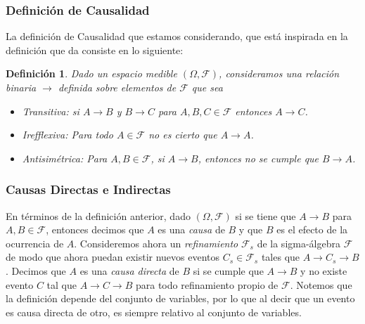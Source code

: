 \documentclass[11pt]{article}
\theoremstyle{plain}
\newtheorem{defi}[teo]{Definición}
\begin{document}
		\subsubsection{Definición de Causalidad}
		La definición de Causalidad que estamos considerando, que está inspirada en la definición que da  \cite{spirtes2000causation} consiste en lo siguiente:
		\begin{defi}
		Dado un espacio medible $(\Omega, \mathcal{F})$, consideramos una relación binaria $\to$ definida sobre elementos de $\mathcal{F}$ que sea
		\begin{itemize}
		\item Transitiva: si $A \to B$ y $B \to C$ para $A,B,C \in \mathcal{F}$ entonces $A \to C$.
		\item Irefflexiva: Para todo $A \in \mathcal{F}$ no es cierto que $A \to A$.
		\item Antisimétrica: Para $A, B \in \mathcal{F}$, si $A \to B$, entonces no se cumple que $B \to A$.
		\end{itemize}
		\end{defi}
		\subsubsection{Causas Directas e Indirectas}
		En términos de la definición anterior, dado $(\Omega, \mathcal{F})$ si se tiene que $A \to B$ para $A,B \in \mathcal{F}$, entonces decimos que $A$ es una \textit{causa} de $B$ y que $B$ es el efecto de la ocurrencia de $A$. Consideremos ahora un \textit{refinamiento} $\mathcal{F}_s$ de la sigma-álgebra $\mathcal{F}$ de modo que ahora puedan existir nuevos eventos $C_s \in \mathcal{F}_s$ tales que $A \to C_s \to B$. Decimos que $A$ es una \textit{causa directa} de $B$ si se cumple que $A \to B$ y no existe evento $C$ tal que $A \to C \to B$ para todo refinamiento propio de $\mathcal{F}$. Notemos que la definición depende del conjunto de variables, por lo que al decir que un evento es causa directa de otro, es siempre relativo al conjunto de variables. 
		
\end{document}
